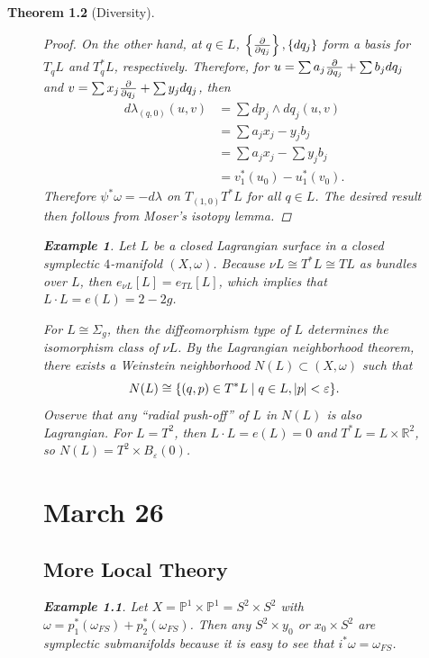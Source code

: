 \documentclass[leqno, openany]{memoir}
\newtheorem{thm}{Theorem}[chapter]
\theoremstyle{definition}
\newtheorem{exm}[thm]{Example}
\theoremstyle{remark}
\theoremstyle{plain}
\theoremstyle{definition}
\theoremstyle{remark}
\newcommand{\R}{\mathbb{R}}
\renewcommand{\P}{\mathbb{P}}
\newcommand{\ep}{\varepsilon}
\begin{document}
\begin{thm}[Diversity]
\begin{figure}[H]
\begin{proof}
        On the other hand, at $q \in L$, $\left\{ \pdv{q_j} \right\}, \{ dq_j
        \}$ form a basis for $T_q L$ and $T_q^* L$, respectively. Therefore,
        for $u = \sum a_j \pdv{q_j} + \sum b_j dq_j$ and $v = \sum x_j
        \pdv{q_j} + \sum y_j dq_j$, then \begin{align*} d \lambda_{(q,0)}(u,v)
        &= \sum dp_j \wedge dq_j (u,v) \\ &= \sum a_j x_j - y_j b_j \\ &= \sum
        a_j x_j - \sum y_j b_j \\ &= v_1^*(u_0) - u_1^*(v_0).  \end{align*}
        Therefore $\psi^* \omega = -d\lambda$ on $T_{(1,0)} T^*L$ for all $q
        \in L$. The desired result then follows from Moser's isotopy lemma.
    \end{proof}

    \begin{exm} Let $L$ be a closed Lagrangian surface in a closed symplectic
        $4$-manifold $(X, \omega)$. Because $\nu L \cong T^*L \cong TL$ as
        bundles over $L$, then $e_{\nu L} [L] = e_{TL}[L]$, which implies that
        $L \cdot L = e(L) = 2 - 2g$.

        For $L \cong \Sigma_g$, then the diffeomorphism type of $L$ determines
        the isomorphism class of $\nu L$. By the Lagrangian neighborhood
        theorem, there exists a \textit{Weinstein neighborhood} $N(L) \subset
        (X, \omega)$ such that \[ N(L) \cong \{ (q,p) \in T^* L \mid q \in L,
        \abs{p} < \ep \}. \] Ovserve that any ``radial push-off'' of $L$ in
    $N(L)$ is also Lagrangian. For $L = T^2$, then $L \cdot L = e(L) = 0$ and
$T^*L = L \times \R^2$, so $N(L) = T^2 \times B_{\ep}(0)$.  \end{exm}

    \chapter{March 26}%

    \section{More Local Theory}%
    
    \begin{exm} Let $X = \P^1 \times \P^1 = S^2 \times S^2$ with $\omega =
        p_1^* (\omega_{FS}) + p_2^*(\omega_{FS})$. Then any $S^2 \times y_0$ or
        $x_0 \times S^2$ are symplectic submanifolds because it is easy to see
        that $i^* \omega = \omega_{FS}$.


\end{exm}
\end{figure}
\end{thm}
\end{document}
